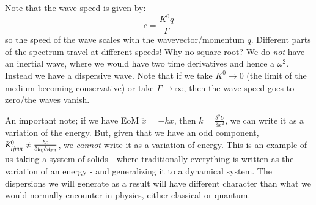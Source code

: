 Note that the wave speed is given by:
\begin{equation}
    c = \frac{K^0 q}{\Gamma}
\end{equation}
so the speed of the wave scales with the wavevector/momentum $q$. Different parts of the spectrum travel at different speeds! Why no square root? We do \emph{not} have an inertial wave, where we would have two time derivatives and hence a $\omega^2$. Instead we have a dispersive wave. Note that if we take $K^0 \to 0$ (the limit of the medium becoming conservative) or take $\Gamma \to \infty$, then the wave speed goes to zero/the waves vanish.

An important note; if we have EoM $\ddot{x} = -kx$, then $k = \frac{\delta^2 U}{\delta x^2}$, we can write it as a variation of the energy. But, given that we have an odd component, $K^0_{ijmn} \neq \frac{\delta \epsilon}{\delta u_{ij}\delta u_{mn}}$, we \emph{cannot} write it as a variation of energy. This is an example of us taking a system of solids - where traditionally everything is written as the variation of an energy - and generalizing it to a dynamical system. The dispersions we will generate as a result will have different character than what we would normally encounter in physics, either classical or quantum.

